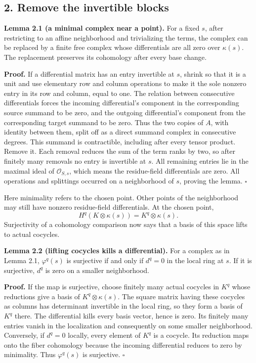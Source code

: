 \documentclass[11pt]{article}
\begin{document}
\subsection{2. Remove the invertible
blocks}\label{remove-the-invertible-blocks}

\textbf{Lemma 2.1 (a minimal complex near a point).} For a fixed \(s\),
after restricting to an affine neighborhood and trivializing the terms,
the complex can be replaced by a finite free complex whose differentials
are all zero over \(\kappa(s)\). The replacement preserves its
cohomology after every base change.

\textbf{Proof.} If a differential matrix has an entry invertible at
\(s\), shrink so that it is a unit and use elementary row and column
operations to make it the sole nonzero entry in its row and column,
equal to one. The relation between consecutive differentials forces the
incoming differential's component in the corresponding source summand to
be zero, and the outgoing differential's component from the
corresponding target summand to be zero. Thus the two copies of \(A\),
with identity between them, split off as a direct summand complex in
consecutive degrees. This summand is contractible, including after every
tensor product. Remove it. Each removal reduces the sum of the term
ranks by two, so after finitely many removals no entry is invertible at
\(s\). All remaining entries lie in the maximal ideal of
\(\mathcal O_{S,s}\), which means the residue-field differentials are
zero. All operations and splittings occurred on a neighborhood of \(s\),
proving the lemma. \(\square\)

Here minimality refers to the chosen point. Other points of the
neighborhood may still have nonzero residue-field differentials. At the
chosen point, \[
H^q(K\otimes\kappa(s))=K^q\otimes\kappa(s).
\] Surjectivity of a cohomology comparison now says that a basis of this
space lifts to actual cocycles.

\textbf{Lemma 2.2 (lifting cocycles kills a differential).} For a
complex as in Lemma 2.1, \(\varphi^q(s)\) is surjective if and only if
\(d^q=0\) in the local ring at \(s\). If it is surjective, \(d^q\) is
zero on a smaller neighborhood.

\textbf{Proof.} If the map is surjective, choose finitely many actual
cocycles in \(K^q\) whose reductions give a basis of
\(K^q\otimes\kappa(s)\). The square matrix having these cocycles as
columns has determinant invertible in the local ring, so they form a
basis of \(K^q\) there. The differential kills every basis vector, hence
is zero. Its finitely many entries vanish in the localization and
consequently on some smaller neighborhood. Conversely, if \(d^q=0\)
locally, every element of \(K^q\) is a cocycle. Its reduction maps onto
the fiber cohomology because the incoming differential reduces to zero
by minimality. Thus \(\varphi^q(s)\) is surjective. \(\square\)
\end{document}
